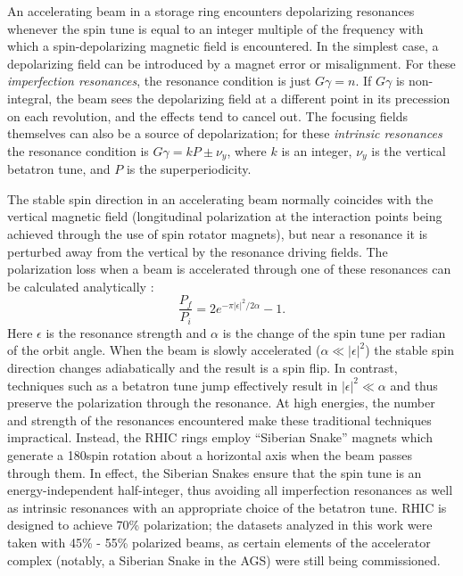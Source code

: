 An accelerating beam in a storage ring encounters depolarizing resonances
whenever the spin tune is equal to an integer multiple of the frequency with
which a spin-depolarizing magnetic field is encountered. In the simplest case,
a depolarizing field can be introduced by a magnet error or misalignment. For
these \textit{imperfection resonances}, the resonance condition is just
$G\gamma = n$. If $G\gamma$ is non-integral, the beam sees the depolarizing
field at a different point in its precession on each revolution, and the
effects tend to cancel out. The focusing fields themselves can also be a
source of depolarization; for these \textit{intrinsic resonances} the
resonance condition is $G\gamma = kP \pm \nu_y$, where $k$ is an integer,
$\nu_y$ is the vertical betatron tune, and $P$ is the superperiodicity.

The stable spin direction in an accelerating beam normally coincides with the
vertical magnetic field (longitudinal polarization at the interaction points
being achieved through the use of spin rotator magnets), but near a resonance
it is perturbed away from the vertical by the resonance driving fields. The
polarization loss when a beam is accelerated through one of these resonances
can be calculated analytically \cite{Froissart:1960zz}:
%
\begin{equation}
  \frac{P_f}{P_i} = 2 e^{-\pi |\epsilon|^2 / 2\alpha} -1.
\end{equation}
%
Here $\epsilon$ is the resonance strength and $\alpha$ is the change of the
spin tune per radian of the orbit angle. When the beam is slowly accelerated
($\alpha \ll |\epsilon|^2$) the stable spin direction changes adiabatically
and the result is a spin flip. In contrast, techniques such as a betatron tune
jump effectively result in $|\epsilon|^2 \ll \alpha$ and thus preserve the
polarization through the resonance. At high energies, the number and strength
of the resonances encountered make these traditional techniques impractical.
Instead, the RHIC rings employ ``Siberian Snake'' magnets
\cite{Derbenev:1978hv} which generate a 180\degree spin rotation about a
horizontal axis when the beam passes through them. In effect, the Siberian
Snakes ensure that the spin tune is an energy-independent half-integer, thus
avoiding all imperfection resonances as well as intrinsic resonances with an
appropriate choice of the betatron tune. RHIC is designed to achieve 70\%
polarization; the datasets analyzed in this work were taken with 45\% - 55\%
polarized beams, as certain elements of the accelerator complex (notably, a
Siberian Snake in the AGS) were still being commissioned.

